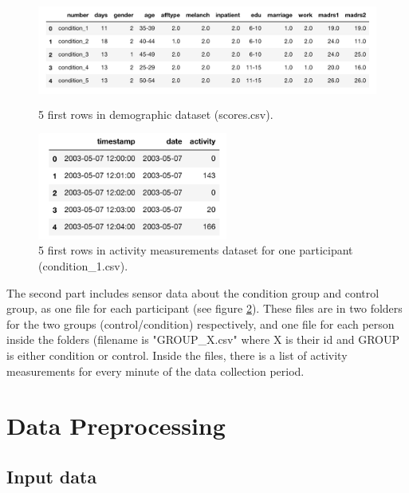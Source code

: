 \begin{figure}
  \begin{center}
      \includegraphics[height=3.5cm]{img/demographics.png}
      \caption{5 first rows in demographic dataset (scores.csv).}
      \label{figure:demographics}
  \end{center}
\end{figure}

\begin{figure}
  \begin{center}
      \includegraphics[height=3.5cm]{img/participant.png}
      \caption{5 first rows in activity measurements dataset for one participant (condition\_1.csv).}
      \label{figure:participant_activity}
  \end{center}
\end{figure}

The second part includes sensor data about the condition group and control group, as one file for each participant (see figure \ref{figure:participant_activity}). These files are in two folders for the two groups (control/condition) respectively, and one file for each person inside the folders (filename is "GROUP\_X.csv" where X is their id and GROUP is either condition or control. Inside the files, there is a list of activity measurements for every minute of the data collection period.

\section{Data Preprocessing}

\subsection{Input data}

